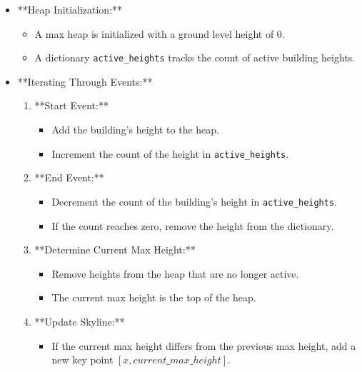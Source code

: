 \begin{itemize}
    \item **Heap Initialization:**
    \begin{itemize}
        \item A max heap is initialized with a ground level height of 0.
        \item A dictionary \texttt{active\_heights} tracks the count of active building heights.
    \end{itemize}
    
    \item **Iterating Through Events:**
    \begin{enumerate}
        \item **Start Event:**
        \begin{itemize}
            \item Add the building's height to the heap.
            \item Increment the count of the height in \texttt{active\_heights}.
        \end{itemize}
        
        \item **End Event:**
        \begin{itemize}
            \item Decrement the count of the building's height in \texttt{active\_heights}.
            \item If the count reaches zero, remove the height from the dictionary.
        \end{itemize}
        
        \item **Determine Current Max Height:**
        \begin{itemize}
            \item Remove heights from the heap that are no longer active.
            \item The current max height is the top of the heap.
        \end{itemize}
        
        \item **Update Skyline:**
        \begin{itemize}
            \item If the current max height differs from the previous max height, add a new key point \([x, current\_max\_height]\).
        \end{itemize}
    \end{enumerate}
\end{itemize}

